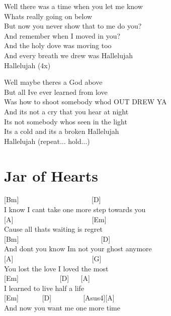 \documentclass[
  letterpaper,
]{scrbook}
\begin{document}
Well there was a time when you let me know\\
What\textquotesingle s really going on below\\
But now you never show that to me do you?\\
And remember when I moved in you?\\
And the holy dove was moving too\\
And every breath we drew was Hallelujah\\
Hallelujah (4x)

Well maybe there\textquotesingle s a God above\\
But all I\textquotesingle ve ever learned from love\\
Was how to shoot somebody who\textquotesingle d OUT DREW YA\\
And it\textquotesingle s not a cry that you hear at night\\
It\textquotesingle s not somebody who\textquotesingle s seen in the
light\\
It\textquotesingle s a cold and it\textquotesingle s a broken
Hallelujah\\
Hallelujah (repeat... hold...)

\hypertarget{jar-of-hearts}{%
\chapter{Jar of Hearts}\label{jar-of-hearts}}

{[}Bm{]} ~ ~ ~ ~ ~ ~ ~ ~ ~ ~ ~ ~ {[}D{]}\\
I know I can\textquotesingle t take one more step towards you\\
{[}A{]} ~ ~ ~ ~ ~ ~ ~ ~ ~ ~ ~ ~ ~ {[}Em{]}\\
\textquotesingle Cause all thats waiting is regret\\
{[}Bm{]} ~ ~ ~ ~ ~ ~ ~ ~ ~ ~ ~ ~ ~ ~{[}D{]}\\
And don\textquotesingle t you know I\textquotesingle m not your ghost
anymore\\
{[}A{]} ~ ~ ~ ~ ~ ~ ~ ~ ~ ~ ~ ~ ~ {[}G{]}\\
You lost the love I loved the most\\
{[}Em{]} ~ ~ ~ ~ ~ ~ ~{[}D{]} ~ ~{[}A{]}\\
I learned to live half a life\\
{[}Em{]} ~ ~ ~ ~{[}D{]} ~ ~ ~ ~ ~ {[}Asus4{]}{[}A{]}\\
And now you want me one more time
\end{document}
